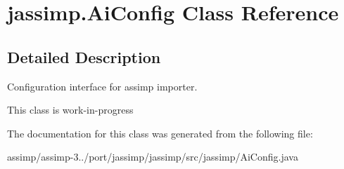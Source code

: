 \hypertarget{classjassimp_1_1_ai_config}{\section{jassimp.\+Ai\+Config Class Reference}
\label{classjassimp_1_1_ai_config}
}


\subsection{Detailed Description}
Configuration interface for assimp importer.

This class is work-\/in-\/progress 

The documentation for this class was generated from the following file\+:\begin{DoxyCompactItemize}
\item 
assimp/assimp-\/3../port/jassimp/jassimp/src/jassimp/Ai\+Config.\+java\end{DoxyCompactItemize}
